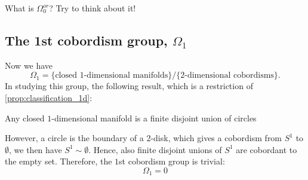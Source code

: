 \begin{exercise}
    What is $\Omega_0^{or}$? Try to think about it! 
\end{exercise}

\subsection{The 1st cobordism group, \texorpdfstring{$\Omega_{1}$}{Omega 1}}
Now we have
$$\Omega_1= \{\text{closed $1$-dimensional manifolds}\} / \{\text{$2$-dimensional cobordisms}\}.$$
In studying this group, the following result, which is a restriction of \ref{prop:classification_1d}:
\begin{thm}
    
    Any closed $1$-dimensional manifold is a finite disjoint union of circles
\end{thm}
\noindent However, a circle is the boundary of a 2-disk, which gives a cobordism from $S^1$ to $\emptyset$, we then have $S^1 \sim \emptyset$. Hence, also finite disjoint unions of $S^1$ are cobordant to the empty set. Therefore, the $1$st cobordism group is trivial:
\begin{equation}
    \Omega_1 = 0
\end{equation}

